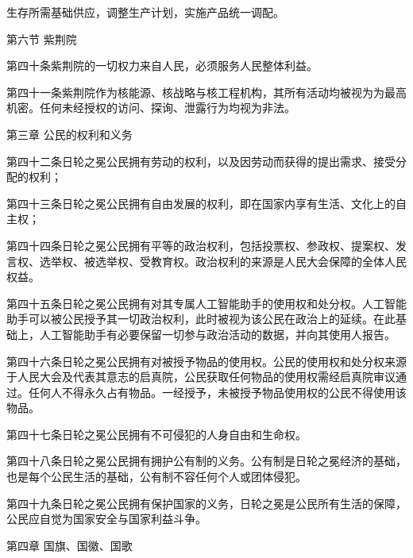{生存所需基础供应，调整生产计划，实施产品统一调配。

\vspace{0.6\baselineskip}

第六节\,\,紫荆院

\vspace{0.6\baselineskip}

\noindent 第四十条\quad 紫荆院的一切权力来自人民，必须服务人民整体利益。

\noindent 第四十一条\quad 紫荆院作为核能源、核战略与核工程机构，其所有活动均被视为为最高机密。任何未经授权的访问、探询、泄露行为均视为非法。

\vspace{0.8\baselineskip}
\begin{center}
{\large 第三章\,\,公民的权利和义务}
\end{center}
\vspace{0.6\baselineskip}

\noindent 第四十二条\quad 日轮之冕公民拥有劳动的权利，以及因劳动而获得的提出需求、接受分配的权利；

\noindent 第四十三条\quad 日轮之冕公民拥有自由发展的权利，即在国家内享有生活、文化上的自主权；

\noindent 第四十四条\quad 日轮之冕公民拥有平等的政治权利，包括投票权、参政权、提案权、发言权、选举权、被选举权、受教育权。政治权利的来源是人民大会保障的全体人民权益。

\noindent 第四十五条\quad 日轮之冕公民拥有对其专属人工智能助手的使用权和处分权。人工智能助手可以被公民授予其一切政治权利，此时被视为该公民在政治上的延续。在此基础上，人工智能助手有必要保留一切参与政治活动的数据，并向其使用人报告。

\noindent 第四十六条\quad 日轮之冕公民拥有对被授予物品的使用权。公民的使用权和处分权来源于人民大会及代表其意志的启真院，公民获取任何物品的使用权需经启真院审议通过。任何人不得永久占有物品。一经授予，未被授予物品使用权的公民不得使用该物品。

\noindent 第四十七条\quad 日轮之冕公民拥有不可侵犯的人身自由和生命权。

\noindent 第四十八条\quad 日轮之冕公民拥有拥护公有制的义务。公有制是日轮之冕经济的基础，也是每个公民生活的基础，公有制不容任何个人或团体侵犯。

\noindent 第四十九条\quad 日轮之冕公民拥有保护国家的义务，日轮之冕是公民所有生活的保障，公民应自觉为国家安全与国家利益斗争。

\vspace{0.8\baselineskip}
\begin{center}
{\large 第四章\,\,国旗、国徽、国歌}
\end{center}
\vspace{0.6\baselineskip}

}
